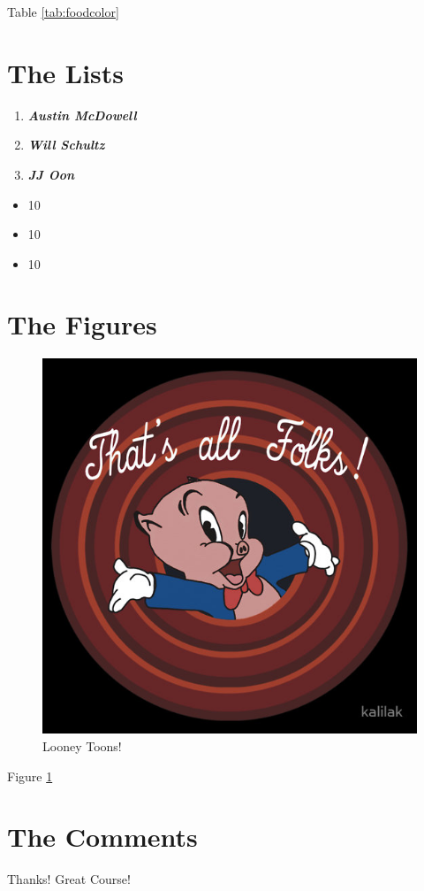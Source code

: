 \documentclass[12pt]{article}
\begin{document}
Table \ref{tab:foodcolor}


\section{The Lists}

\begin{enumerate}
  
  \item \textit{\textbf{Austin McDowell}}
  \item \textit{\textbf{Will Schultz}}
  \item \textit{\textbf{JJ Oon}}
\end{enumerate}

\begin{itemize}

  \item 10
  \item 10
  \item 10

\end{itemize}

\section{The Figures}

\begin{figure}[H]
  \centering
  \includegraphics[width=.5\linewidth]{end.jpg}
  \caption{Looney Toons!}
  \label{fig:end}
\end{figure}
Figure \ref{fig:end}

\section{The Comments}
Thanks! Great Course!
\end{document}
